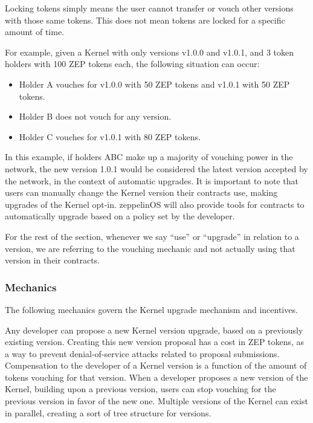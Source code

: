 \documentclass[]{article}
\makeatletter
\DeclareRobustCommand{\_}{%
  \leavevmode\vbox{%
    \hrule\@width.5em
          \@height-.26ex
          \@depth\dimexpr.26ex+.28pt\relax}}
\makeatother
\begin{document}
Locking tokens simply means the user cannot transfer or vouch other
versions with those same tokens. This does not mean tokens are locked for
a specific amount of time.

For example, given a Kernel with only versions v1.0.0 and v1.0.1, and 3
token holders with 100 ZEP tokens each, the following situation can
occur:

\begin{itemize}
  \item
    Holder A vouches for v1.0.0 with 50 ZEP tokens and v1.0.1 with 50 ZEP
    tokens.
  \item
    Holder B does not vouch for any version.
  \item
    Holder C vouches for v1.0.1 with 80 ZEP tokens.
\end{itemize}

In this example, if holders ABC make up a majority of vouching power in
the network, the new version 1.0.1 would be considered the latest
version accepted by the network, in the context of automatic
upgrades. It is important to note that users can manually change the
Kernel version their contracts use, making upgrades of the Kernel
opt-in. zeppelinOS will also provide tools for contracts to
automatically upgrade based on a policy set by the developer.

For the rest of the section, whenever we say ``use'' or ``upgrade'' in
relation to a version, we are referring to the vouching mechanic and not
actually using that version in their contracts.

\subsubsection{Mechanics}

The following mechanics govern the Kernel upgrade mechanism and
incentives.

Any developer can propose a new Kernel version upgrade, based on a
previously existing version. Creating this new version proposal has a
cost in ZEP tokens, as a way to prevent denial-of-service attacks
related to proposal submissions. Compensation to the
developer of a Kernel version is a function of the amount of tokens
vouching for that version. When a developer proposes a new version of
the Kernel, building upon a previous version, users can stop
vouching for the previous version in favor of the new one.
Multiple versions of the Kernel can exist in parallel, creating a sort
of tree structure for versions.
\end{document}
